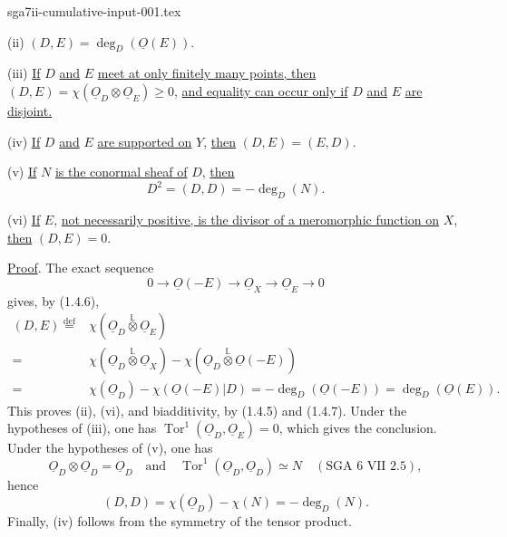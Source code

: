 \begin{filecontents*}{sga7ii-cumulative-input-001.tex}

(ii) \quad $(D,E)=\deg_D(\underline O(E))$.

(iii) \quad \underline{If} $D$ \underline{and} $E$ \underline{meet at only finitely
many points, then} $(D,E)=\chi(\underline{O}_D\otimes\underline{O}_E)\geq0$,
\underline{and equality can occur only if} $D$ \underline{and} $E$
\underline{are disjoint.}

(iv) \quad \underline{If} $D$ \underline{and} $E$ \underline{are supported on} $Y$,
\underline{then} $(D,E)=(E,D)$.

(v) \quad \underline{If} $N$ \underline{is the conormal sheaf of} $D$,
\underline{then}
\begin{equation*}
D^2=(D,D)=-\deg_D(N).
\end{equation*}

(vi) \quad \underline{If} $E$, \underline{not necessarily positive, is the divisor
of a meromorphic function on} $X$, \underline{then} $(D,E)=0$.

\underline{Proof}. The exact sequence
\begin{equation*}
0\longrightarrow\underline O(-E)\longrightarrow\underline O_X
\longrightarrow\underline O_E\longrightarrow0
\end{equation*}
gives, by (1.4.6),
\begin{equation*}
\begin{array}{rl}
(D,E)\overset{\mathrm{def}}{=}&
\chi(\underline{O}_D\overset{\mathbb L}{\otimes}\underline{O}_E)\\
=&\chi(\underline{O}_D\overset{\mathbb L}{\otimes}\underline{O}_X)
-\chi(\underline{O}_D\overset{\mathbb L}{\otimes}\underline O(-E))\\[1ex]
=&\chi(\underline{O}_D)-\chi(\underline O(-E)|D)
=-\deg_D(\underline O(-E))=\deg_D(\underline O(E)).
\end{array}
\end{equation*}
This proves (ii), (vi), and biadditivity, by (1.4.5) and (1.4.7).  Under the
hypotheses of (iii), one has
$\operatorname{Tor}^1(\underline{O}_D,\underline{O}_E)=0$, which gives the
conclusion.  Under the hypotheses of (v), one has
\begin{equation*}
\underline{O}_D\otimes\underline{O}_D=\underline{O}_D
\quad\text{and}\quad
\operatorname{Tor}^1(\underline{O}_D,\underline{O}_D)\simeq N
\quad(\text{SGA 6 VII 2.5}),
\end{equation*}
hence
\begin{equation*}
(D,D)=\chi(\underline{O}_D)-\chi(N)=-\deg_D(N).
\end{equation*}
Finally, (iv) follows from the symmetry of the tensor product.


\end{filecontents*}
